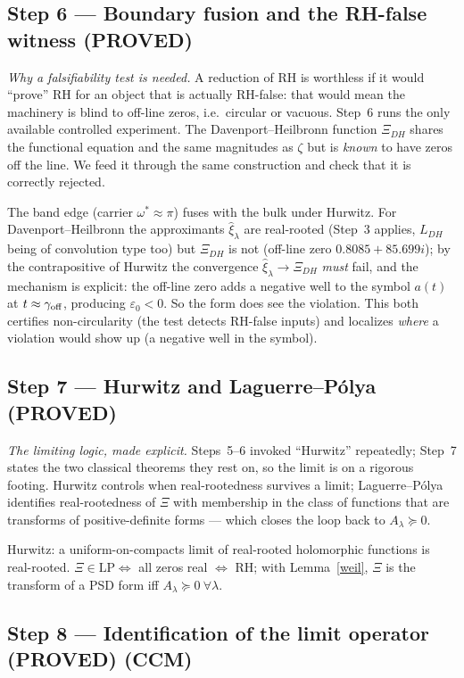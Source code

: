 \documentclass[11pt]{amsart}
\theoremstyle{definition}
\theoremstyle{remark}
\newcommand{\ve}{\varepsilon}
\newcommand{\PROVED}{\textbf{(PROVED)}}
\begin{document}
\subsection{Step 6 --- Boundary fusion and the RH-false witness \PROVED}

\emph{Why a falsifiability test is needed.} A reduction of RH is worthless if it would
``prove'' RH for an object that is actually RH-false: that would mean the machinery is blind to
off-line zeros, i.e.\ circular or vacuous. Step~6 runs the only available controlled experiment.
The Davenport--Heilbronn function $\Xi_{DH}$ shares the functional equation and the same
magnitudes as $\zeta$ but is \emph{known} to have zeros off the line. We feed it through the same
construction and check that it is correctly rejected.

The band edge (carrier $\omega^*\approx\pi$) fuses with the bulk under Hurwitz. For
Davenport--Heilbronn the approximants $\hat\xi_\lambda$ are real-rooted (Step~3 applies, $L_{DH}$
being of convolution type too) but $\Xi_{DH}$ is not (off-line zero $0.8085+85.699i$); by the
contrapositive of Hurwitz the convergence $\hat\xi_\lambda\to\Xi_{DH}$ \emph{must} fail, and the
mechanism is explicit: the off-line zero adds a negative well to the symbol $a(t)$ at
$t\approx\gamma_{\rm off}$, producing $\ve_0<0$. So the form does see the violation. This both
certifies non-circularity (the test detects RH-false inputs) and localizes \emph{where} a
violation would show up (a negative well in the symbol).

\subsection{Step 7 --- Hurwitz and Laguerre--P\'olya \PROVED}

\emph{The limiting logic, made explicit.} Steps~5--6 invoked ``Hurwitz'' repeatedly; Step~7
states the two classical theorems they rest on, so the limit is on a rigorous footing. Hurwitz
controls when real-rootedness survives a limit; Laguerre--P\'olya identifies real-rootedness of
$\Xi$ with membership in the class of functions that are transforms of positive-definite forms
--- which closes the loop back to $A_\lambda\succeq0$.

Hurwitz: a uniform-on-compacts limit of real-rooted holomorphic functions is real-rooted.
$\Xi\in\mathrm{LP}\iff$ all zeros real $\iff$ RH; with Lemma~\ref{weil}, $\Xi$ is the transform
of a PSD form iff $A_\lambda\succeq0\ \forall\lambda$.

\subsection{Step 8 --- Identification of the limit operator \PROVED{} (CCM)}
\end{document}
